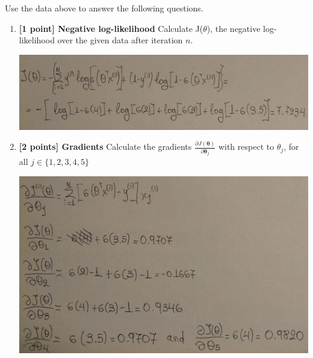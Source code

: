 \documentclass[11pt]{article}
\numberwithin{equation}{section} %
\numberwithin{figure}{section} %
\numberwithin{table}{section} %
\newcommand{\thetav     }{\boldsymbol \theta     }
\begin{document}
Use the data above to answer the following questions. 
 \begin{enumerate}
     \item {\bf  [1 point] Negative log-likelihood} Calculate J($\theta$), the negative log-likelihood over the given data after iteration $n$. 
     \begin{solution}
    \includegraphics[scale=0.14]{pic5}
    \end{solution}
    \clearpage
    
     \item {\bf [2 points] Gradients} Calculate the gradients $\frac{\partial J(\thetav)}{\partial \thetav_j}$ with respect to $\theta_{j}$, for all $j \in \{1, 2, 3, 4, 5\}$
      \begin{solution}
    \includegraphics[scale=0.15]{pic6}
    \end{solution}
    

\end{enumerate}
\end{document}
